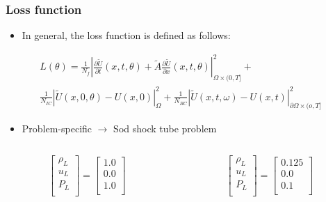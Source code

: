 \documentclass[aspectratio=169]{beamer}
\begin{document}

\begin{frame}\frametitle{Loss function}
	
	\begin{itemize}
		\item In general, the loss function is defined as follows:
	\end{itemize}

	\begin{gather*}
			L(\theta) = \frac{1}{N_f} \left | \frac{\partial \tilde{U}}{\partial t} (x,t,\theta) + \tilde{A} \frac{\partial \tilde{U}}{\partial x} (x, t, \theta) \right |^2_{\Omega \times (0, T]} + \\ \frac{1}{N_{IC}} \left | \tilde{U}(x, 0, \theta) - U(x, 0) \right |^2_{\Omega} + \frac{1}{N_{BC}} \left | \tilde{U}(x, t, \omega) - U(x,t) \right |^2_{\partial \Omega \times (o, T]}
	\end{gather*}
			
	\begin{itemize}
		\item Problem-specific $\rightarrow$ Sod shock tube problem
	\end{itemize}
	
	\begin{columns}
		\begin{column}{0.5\textwidth}
			\begin{equation*}
				\begin{bmatrix}
					\rho_L \\
					u_L \\
					P_L \\
				\end{bmatrix} = \begin{bmatrix}
					1.0 \\
					0.0 \\
					1.0 \\
				\end{bmatrix}
			\end{equation*}
		\end{column}
		
		
		\begin{column}{0.5\textwidth}
			\begin{equation*}
				\begin{bmatrix}
					\rho_L \\
					u_L \\
					P_L \\
				\end{bmatrix} = \begin{bmatrix}
					0.125 \\
					0.0 \\
					0.1 \\
				\end{bmatrix}
			\end{equation*}
		\end{column}	
	\end{columns}
	

\end{frame}
\end{document}
